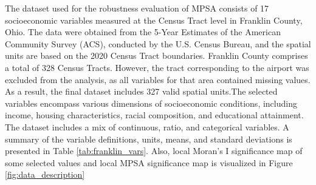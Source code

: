 \documentclass[
  a4paper,
  12pt]{article}
\begin{document}
The dataset used for the robustness evaluation of MPSA consists of 17
socioeconomic variables measured at the Census Tract level in Franklin
County, Ohio. The data were obtained from the 5-Year Estimates of the
American Community Survey (ACS), conducted by the U.S. Census Bureau,
and the spatial units are based on the 2020 Census Tract boundaries.
Franklin County comprises a total of 328 Census Tracts. However, the
tract corresponding to the airport was excluded from the analysis, as
all variables for that area contained missing values. As a result, the
final dataset includes 327 valid spatial units.The selected variables
encompass various dimensions of socioeconomic conditions, including
income, housing characteristics, racial composition, and educational
attainment. The dataset includes a mix of continuous, ratio, and
categorical variables. A summary of the variable definitions, units,
means, and standard deviations is presented in Table
\ref{tab:franklin_vars}. Also, local Moran's I significance map of some
selected values and local MPSA significance map is visualized in Figure
\ref{fig:data_description}
\end{document}
